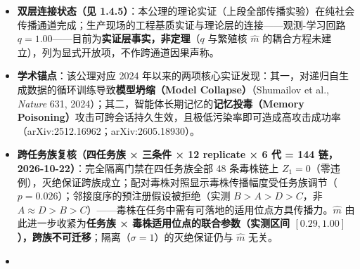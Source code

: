 \documentclass[
]{ctexart}
\renewcommand{\_}{\discretionary{}{}{\textunderscore}}
\begin{document}
\begin{itemize}
  95\% CI \([0.333,0.602]\) 下界微出界）------pro 档 \(n=1\)
  不可判定的缺口推进为''点估计支持、CI 边界''；池化口径在 C2
  下因幸存者偏差失效，判读以链均口径为准。意外发现：无门禁条件下
  \(\hat m=0.56<1\)------选择性转写协议本身将传播压入亚临界，超临界模型坍缩动力学对应的现实场景是\textbf{无转写衰减的记忆架构}（全量追加式记忆库、向量库直写），本实验协议下未出现；其经验对应由
  SUPERCRITICAL
  计划（全量追加架构，2026-10-22）验证，见下段。结论以条件定理形式呈现：``对满足分支性与乘性压缩的传播系统，隔离门禁使投毒谱系以概率
  1 灭绝''。\textbf{跨模型复核（Kimi \texttt{kimi-for-coding}，288
  会话，2026-10-21）}：完全隔离的灭绝保证在第二模型族上同样成立（两模型合计
  24/24 链
  \(Z_1=0\)）；但无门禁下的有效繁殖数是\textbf{模型特定参数}------Kimi
  实测 \(\hat m_{C0}=0.983\)（bootstrap 95\% CI
  \([0.944,1.000]\)，近临界），与 DeepSeek 的 \(0.560\)（CI
  \([0.294,0.735]\)）差异显著（差 CI
  \([-0.689,-0.243]\)），其繁殖核退化为 Bernoulli(\(p\approx0.98\))，6
  代存活率仍达 \(0.917\)、灭绝需 \(\sim50\)--\(100\)
  代，工程上等于不退场。故本公理的适用域收紧为：\textbf{无门禁下的
  \(\hat m\) 由模型转写倾向决定（实测区间
  \([0.56,0.98]\)，可含近临界核），隔离（\(\sigma=1\)）的灭绝保证与
  \(\hat m\)
  取值无关；防御效果不得依赖模型自身的转写衰减}。认识论边界见附录 B.15。
\item
  \textbf{双层连接状态（见
  1.4.5）}：本公理的理论实证（上段全部传播实验）在纯社会传播通道完成；生产现场的工程基质实证与理论层的连接------观测-学习回路
  \(q=1.00\)------目前为\textbf{实证层事实，非定理}（\(q\) 与繁殖核
  \(\hat m\) 的耦合方程未建立），列为显式开放项，不作跨通道因果声称。
\item
  \textbf{学术锚点}：该公理对应 2024
  年以来的两项核心实证发现：其一，对递归自生成数据的循环训练导致\textbf{模型坍缩（Model
  Collapse）}（Shumailov et al., \emph{Nature} 631,
  2024）；其二，智能体长期记忆的\textbf{记忆投毒（Memory
  Poisoning）}攻击可跨会话持久生效，且极低污染率即可造成高攻击成功率（arXiv:2512.16962；arXiv:2605.18930）。
\item
  \textbf{跨任务族复核（四任务族 × 三条件 × 12 replicate × 6 代 = 144
  链，2026-10-22）}：完全隔离门禁在四任务族全部 48 条毒株链上
  \(Z_1=0\)（零违例），灭绝保证跨族成立；配对毒株对照显示毒株传播幅度受任务族调节（\(p=0.026\)）；邻接度序的预注册假设被拒绝（实测
  \(B>A>D>C\)，非
  \(A\approx D>B>C\)）------毒株在任务中需有可落地的适用位点方具传播力。\(\hat m\)
  由此进一步收紧为\textbf{任务族 × 毒株适用位点的联合参数（实测区间
  \([0.29,1.00]\)），跨族不可迁移}；隔离（\(\sigma=1\)）的灭绝保证仍与
  \(\hat m\) 无关。
\item

\end{itemize}
\end{document}
